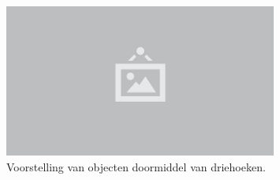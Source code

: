 \begin{figure}
  \centering
  \includegraphics[width=0.8\textwidth]{./img/raw/placeholder.png}
  \caption{Voorstelling van objecten doormiddel van driehoeken.}
  \label{fig:gd-object}
\end{figure}
